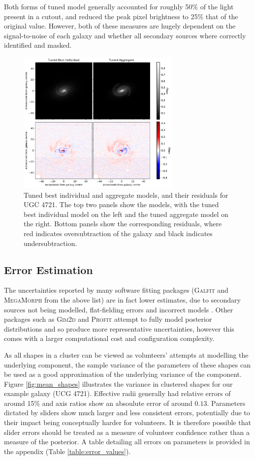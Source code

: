 \documentclass[../main.tex]{subfiles}
\begin{document}
Both forms of tuned model generally accounted for roughly 50\% of the light present in a cutout, and reduced the peak pixel brightness to 25\% that of the original value. However, both of these measures are hugely dependent on the signal-to-noise of each galaxy and whether all secondary sources where correctly identified and masked.


\begin{figure}
  \includegraphics[width=8cm]{images__method/bi_vs_agg_comparison.pdf}
  \caption{Tuned best individual and aggregate models, and their residuals for UGC 4721. The top two panels show the models, with the tuned best individual model on the left and the tuned aggregate model on the right. Bottom panels show the corresponding residuals, where red indicates oversubtraction of the galaxy and black indicates undersubtraction.}
  \label{fig:bi_vs_agg_comparison}
\end{figure}

\subsection{Error Estimation}
\label{sec:error_estimation}
The uncertainties reported by many software fitting packages (\textsc{Galfit} and \textsc{MegaMorph} from the above list) are in fact lower estimates, due to secondary sources not being modelled, flat-fielding errors and incorrect models \citep{2010AJ....139.2097P}. Other packages such as \textsc{Gim2d} and \textsc{Profit} attempt to fully model posterior distributions and so produce more representative uncertainties, however this comes with a larger computational cost and configuration complexity.

As all shapes in a cluster can be viewed as volunteers' attempts at modelling the underlying component, the sample variance of the parameters of these shapes can be used as a good approximation of the underlying variance of the component. Figure \ref{fig:mean_shapes} illustrates the variance in clustered shapes for our example galaxy (UCG 4721). Effective radii generally had relative errors of around 15\% and axis ratios show an absoulute error of around $0.13$. Parameters dictated by sliders show much larger and less consistent errors, potentially due to their impact being conceptually harder for volunteers. It is therefore possible that slider errors should be treated as a measure of volunteer confidence rather than a measure of the posterior. A table detailing all errors on parameters is provided in the appendix (Table \ref{table:error_values}).
\end{document}
